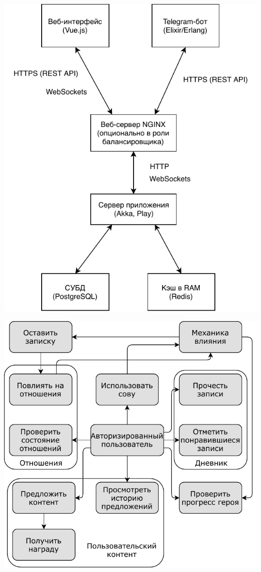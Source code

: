 \documentclass[12pt, a4paper]{article}
\begin{document}
\begin{center}
\includegraphics{architecture-overview.pdf}
\end{center}
\begin{center}
\includegraphics{uml_usecases.pdf}
\end{center}
\end{document}
